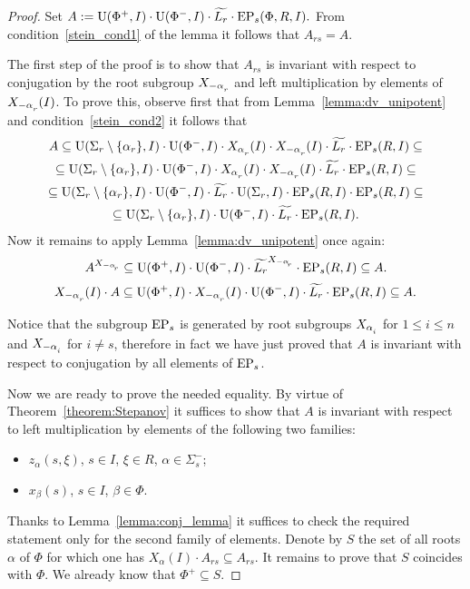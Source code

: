 \begin{proof} Set $A:=\operatorname{U}(\Phi^+, I)\cdot \operatorname{U}(\Phi^-, I) \cdot \widetilde{L_r} \cdot \operatorname{EP}_s(\Phi, R, I).$
From condition~\ref{stein_cond1} of the lemma it follows that $A_{rs}=A$.

The first step of the proof is to show that $A_{rs}$ is invariant with respect to conjugation by the root subgroup $X_{-\alpha\ssub{r}}$ 
and left multiplication by elements of $X_{-\alpha\ssub{r}}(I)$. To prove this, observe first that from Lemma~\ref{lemma:dv_unipotent} and condition~\ref{stein_cond2} it follows that
\begin{multline}\nonumber 
A \subseteq \U(\Sigma_r\setminus \{\alpha_r\}, I) \cdot \U(\Phi^-, I) \cdot X_{\alpha\ssub{r}}(I) \cdot X_{-\alpha\ssub{r}}(I) \cdot \widetilde{L_r} \cdot \EP_s(R, I) \subseteq \\ 
\subseteq \U(\Sigma_r\setminus\{\alpha_r\}, I) \cdot \U(\Phi^-, I) \cdot X_{\alpha\ssub{r}}(I) \cdot X_{-\alpha\ssub{r}}(I) \cdot \widetilde{L_r} \cdot \EP_s(R, I) \subseteq \\
\subseteq \U(\Sigma_r\setminus\{\alpha_r\}, I) \cdot \U(\Phi^-, I) \cdot \widetilde{L_r} \cdot \U(\Sigma_r, I) \cdot \EP_s(R, I)  \cdot \EP_s(R, I) \subseteq \\
\subseteq \U(\Sigma_r\setminus\{\alpha_r\}, I) \cdot \U(\Phi^-, I) \cdot \widetilde{L_r} \cdot \EP_s(R, I). \end{multline}
Now it remains to apply Lemma~\ref{lemma:dv_unipotent} once again:
\begin{equation}\nonumber A^{X_{-\alpha\ssub{r}}} \subseteq \U(\Phi^+, I) \cdot \U(\Phi^-, I) \cdot \widetilde{L_r} ^{X_{-\alpha\ssub{r}}} \cdot \EP_s(R, I) \subseteq A. \end{equation}
\begin{equation}\nonumber X_{-\alpha\ssub{r}}(I) \cdot A \subseteq \U(\Phi^+, I) \cdot X_{-\alpha\ssub{r}}(I) \cdot \U(\Phi^-, I) \cdot \widetilde{L_r} \cdot \EP_s(R, I) \subseteq A. \end{equation}

Notice that the subgroup $\operatorname{EP}_s$ is generated by root subgroups $X_{\alpha\ssub{i}}$ for $1\leq i\leq n$ and $X_{-\alpha\ssub{i}}$ for $i\neq s$,
therefore in fact we have just proved that $A$ is invariant with respect to conjugation by all elements of $\operatorname{EP}_s$.

Now we are ready to prove the needed equality. By virtue of Theorem~\ref{theorem:Stepanov} it suffices to show that
$A$ is invariant with respect to left multiplication by elements of the following two families:
\begin{itemize} \item $z_{\alpha}(s, \xi)$, $s\in I$, $\xi \in R$, $\alpha\in\Sigma^-_s$;
 \item $x_{\beta}(s)$, $s \in I$, $\beta \in \Phi$. \end{itemize}
Thanks to Lemma~\ref{lemma:conj_lemma} it suffices to check the required statement only for the second family of elements.
Denote by $S$ the set of all roots $\alpha$ of $\Phi$ for which one has $X_{\alpha}(I)\cdot A_{rs}\subseteq A_{rs}$.
It remains to prove that $S$ coincides with $\Phi$. We already know that $\Phi^+ \subseteq S$.


\end{proof}
